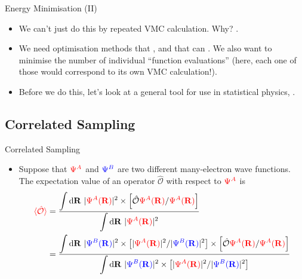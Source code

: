 \documentclass[12pt, pdf, hyperref={draft}, usenames, dvipsnames,
aspectratio=169]{beamer}
\newcommand{\dd}{\mathrm{d}}
\newcommand{\expt}[1]{\langle{#1}\rangle}
\newcommand{\red}[1]{{\bf\color{LancsRed}{#1}}}
\newcommand{\blue}[1]{{\bf\color{NavyBlue}{#1}}}
\begin{document}
\begin{frame}{Energy Minimisation (II)}
\begin{itemize}
  \item We can't just do this by repeated VMC calculation. Why? \red{Noise}.
  \item We need optimisation methods that \blue{don't require derivatives}, and that
  can \blue{cope with noise}. We also want to minimise the number of individual
  ``function evaluations'' (here, each one of those would correspond to its own
  VMC calculation!).
  \item Before we do this, let's look at a general tool for use in statistical
  physics, \blue{correlated sampling}.
\end{itemize}
\end{frame}

\subsection{Correlated Sampling}\label{sub:correlated_sampling}

\begin{frame}{Correlated Sampling}
\begin{itemize}
  \item Suppose that $\color{red}{\Psi^A}$ and $\color{blue}{\Psi^B}$ are two different
  many-electron wave functions. The expectation value of an operator
  $\mathcal{\hat O}$ with respect to $\color{red}{\Psi^A}$ is
  \begin{align}
    {\color{red}{\expt{\mathcal{\hat O}}}} &=
    \dfrac{\displaystyle\int\dd{\bf R}\ \lvert {\color{red}{\Psi^A({\bf
    R})}}\rvert^2 \times \left[ \mathcal{\hat O} {\color{red}{\Psi^A({\bf R})}} /
    {\color{red}{\Psi^A({\bf R})}}  \right]}
    {\displaystyle\int\dd{\bf R}\ \lvert {\color{red}{\Psi^A({\bf R})}}
    \rvert^2} \nonumber \\
    &=
    \dfrac{\displaystyle\int\dd{\bf R}\ \lvert {\color{blue}{\Psi^B({\bf
    R})}}\rvert^2 \times
    \left[ \lvert{\color{red}{\Psi^A({\bf R})}}\rvert^2  /
    \lvert{\color{blue}{\Psi^B({\bf R})}}\rvert^2  \right] \times
    \left[ \mathcal{\hat O} {\color{red}{\Psi^A({\bf R})}} /
    {\color{red}{\Psi^A({\bf R})}}  \right]}
    {\displaystyle\int\dd{\bf R}\ \lvert {\color{blue}{\Psi^B({\bf R})}}
    \rvert^2 \times
    \left[ \lvert{\color{red}{\Psi^A({\bf R})}}\rvert^2  /
    \lvert{\color{blue}{\Psi^B({\bf R})}}\rvert^2  \right]
    }
  \end{align}
\end{itemize}
\end{frame}
\end{document}
